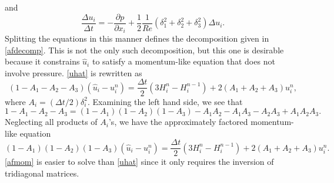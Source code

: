 \documentclass[10pt]{article}
\begin{document}
and
\begin{equation}\label{Deltau}
\frac{\Delta u_i}{\Delta t}=-\frac{\partial p}{\partial x_i}+
  \frac{1}{2}\frac{1}{Re}\left(\delta_1^2+\delta_2^2+\delta_3^2\right)
  \Delta u_i.
\end{equation}
Splitting the equations in this manner defines the decomposition given
in \autoref{afdecomp}.  This is not the only such decomposition, but
this one is desirable because it constrains $\hat{u}_i$ to satisfy a
momentum-like equation that does not involve pressure.
\autoref{uhat} is rewritten as
\begin{equation}
(1-A_1-A_2-A_3)(\hat{u}_i-u_i^n)=\frac{\Delta t}{2}(3H_i^n - H_i^{n-1})
+2(A_1+A_2+A_3)u_i^n,
\end{equation}
where $A_i=(\Delta t / 2)\delta_i^2$.  Examining the left hand side,
we see that
\begin{equation}
1-A_1-A_2-A_3=(1-A_1)(1-A_2)(1-A_3)-A_1A_2-A_1A_3-A_2A_3+A_1A_2A_3.
\end{equation}
Neglecting all products of $A_i$'s, we have the approximately factored
momentum-like equation
\begin{equation}\label{afmom}
(1-A_1)(1-A_2)(1-A_3)(\hat{u}_i-u_i^n)=\frac{\Delta t}{2}(3H_i^n - H_i^{n-1})
+2(A_1+A_2+A_3)u_i^n.
\end{equation}
\autoref{afmom} is easier to solve than \autoref{uhat} since
it only requires the inversion of tridiagonal matrices.
\end{document}
